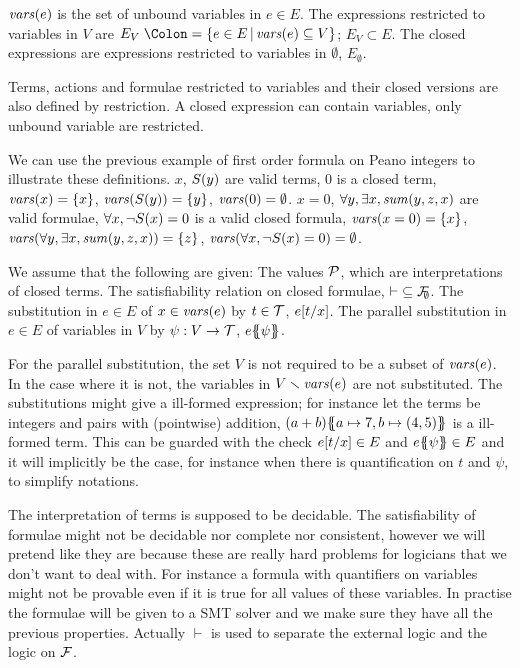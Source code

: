 \documentclass{article}
\begin{document}
\begin{defi}
 \(\mathit{vars}{\left(e\right)}\) is the set of unbound variables in \(e \in E\).
 The expressions restricted to variables in \(V\) are \(E_V \defnotation \mset{e \in E}{\fvars{e} \subseteq V}\); \(E_V \subset E\).
 The closed expressions are expressions restricted to variables in \(\emptyset\), \(E_\emptyset\).
\end{defi}
Terms, actions and formulae restricted to variables and their closed versions are also defined by restriction.
A closed expression can contain variables, only unbound variable are restricted.

We can use the previous example of first order formula on Peano integers to illustrate these definitions.
\(x\), \(S{\left(y\right)}\) are valid terms, \(0\) is a closed term, \(\mathit{vars}{\left(x\right)} = {\left\{x\right\}}\), \(\mathit{vars}{\left(S{\left(y\right)}\right)} = {\left\{y\right\}}\), \(\mathit{vars}{\left(0\right)} = \emptyset\).
\(x = 0\), \(\forall y, \exists x, \mathit{sum}{\left(y, z, x\right)}\) are valid formulae, \(\forall x, \neg S{\left(x\right)} = 0\) is a valid closed formula, \(\mathit{vars}{\left(x = 0\right)} = {\left\{x\right\}}\), \(\mathit{vars}{\left(\forall y, \exists x, \mathit{sum}{\left(y, z, x\right)}\right)} = {\left\{z\right\}}\), \(\mathit{vars}{\left(\forall x, \neg S{\left(x\right)} = 0\right)} = \emptyset\).

\begin{defi}
We assume that the following are given:
 The values \(\mathcal{P}\), which are interpretations of closed terms.
 The satisfiability relation on closed formulae, \({\vdash} \subseteq {\mathcal{F}}_{\!\!\emptyset}\).
 The substitution in \(e \in E\) of \(x \in \mathit{vars}{\left(e\right)}\) by \(t \in {\mathcal{T}}\), \(e{\left[t\middle/x\right]}\).
 The parallel substitution in \(e \in E\) of variables in \(V\) by \(\psi: V \to {\mathcal{T}}\), \(e{\left\{\!\!{\left\{\psi\right\}}\!\!\right\}}\).
\end{defi}
For the parallel substitution, the set \(V\) is not required to be a subset of \(\mathit{vars}{\left(e\right)}\).
In the case where it is not, the variables in \(V \smallsetminus \mathit{vars}{\left(e\right)}\) are not substituted.
The substitutions might give a ill-formed expression; for instance let the terms be integers and pairs with (pointwise) addition, \({\left(a + b\right)}{\left\{\!\!{\left\{a \mapsto 7, b \mapsto {\left(4, 5\right)}\right\}}\!\!\right\}}\) is a ill-formed term.
This can be guarded with the check \(e{\left[t\middle/x\right]} \in E\) and \(e{\left\{\!\!{\left\{\psi\right\}}\!\!\right\}} \in E\) and it will implicitly be the case, for instance when there is quantification on \(t\) and \(\psi\), to simplify notations.

The interpretation of terms is supposed to be decidable.
The satisfiability of formulae might not be decidable nor complete nor consistent, however we will pretend like they are because these are really hard problems for logicians that we don't want to deal with.
For instance a formula with quantifiers on variables might not be provable even if it is true for all values of these variables.
In practise the formulae will be given to a SMT solver and we make sure they have all the previous properties.
Actually \(\vdash\) is used to separate the external logic and the logic on \({\mathcal{F}}\).
\end{document}
